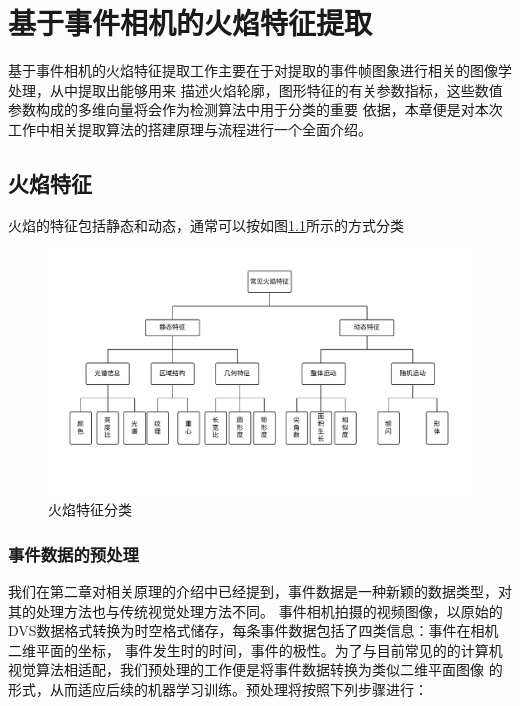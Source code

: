 
\chapter{基于事件相机的火焰特征提取}
基于事件相机的火焰特征提取工作主要在于对提取的事件帧图象进行相关的图像学处理，从中提取出能够用来
描述火焰轮廓，图形特征的有关参数指标，这些数值参数构成的多维向量将会作为检测算法中用于分类的重要
依据，本章便是对本次工作中相关提取算法的搭建原理与流程进行一个全面介绍。

\section{火焰特征}
火焰的特征包括静态和动态，通常可以按如图\ref{5}所示的方式分类
\begin{figure}
    \centering
    \includegraphics[width=\textwidth]{figures/extract_characteristic.pdf}
    \caption{火焰特征分类}
    \label{5}
\end{figure}

\subsection{事件数据的预处理}
我们在第二章对相关原理的介绍中已经提到，事件数据是一种新颖的数据类型，对其的处理方法也与传统视觉处理方法不同。
事件相机拍摄的视频图像，以原始的DVS数据格式转换为时空格式储存，每条事件数据包括了四类信息：事件在相机二维平面的坐标，
事件发生时的时间，事件的极性。为了与目前常见的的计算机视觉算法相适配，我们预处理的工作便是将事件数据转换为类似二维平面图像
的形式，从而适应后续的机器学习训练。预处理将按照下列步骤进行：

